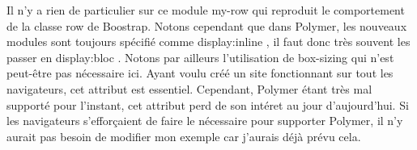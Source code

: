 \documentclass{article}
\begin{document}
Il n'y a rien de particulier sur ce module \og my-row \fg{} qui reproduit le comportement de la classe \og row \fg{} de Boostrap. Notons cependant que dans Polymer, les nouveaux modules sont toujours sp\'ecifi\'e comme \og display:inline \fg{}, il faut donc tr\`es souvent les passer en \og display:bloc \fg{}. Notons par ailleurs l'utilisation de box-sizing qui n'est peut-\^etre pas n\'ecessaire ici. Ayant voulu cr\'e\'e un site fonctionnant sur tout les navigateurs, cet attribut est essentiel. Cependant, Polymer \'etant tr\`es mal support\'e pour l'instant, cet attribut perd de son int\'eret au jour d'aujourd'hui. Si les navigateurs s'effor\c{c}aient de faire le n\'ecessaire pour supporter Polymer, il n'y aurait pas besoin de modifier mon exemple car j'aurais d\'ej\`a pr\'evu cela.
\vspace{0.5cm}\\
\vspace{0.5cm}
\end{document}
